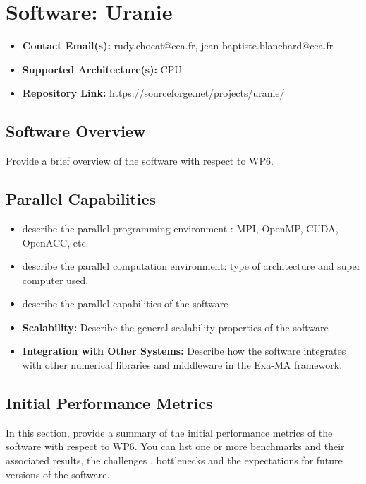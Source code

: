 \section{Software: Uranie}
\label{sec:WP6:Uranie:software}

\begin{itemize}
    \item \textbf{Contact Email(s):} rudy.chocat@cea.fr, jean-baptiste.blanchard@cea.fr
    \item \textbf{Supported Architecture(s):} CPU
    \item \textbf{Repository Link:} \href{https://sourceforge.net/projects/uranie/}{https://sourceforge.net/projects/uranie/}
\end{itemize}

\subsection{Software Overview}
\label{sec:WP6:Uranie:summary}

Provide a brief overview of the software with respect to WP6.

\subsection{Parallel Capabilities}
\label{sec:WP6:Uranie:performances}


\begin{itemize}
    \item describe the parallel programming  environment : MPI, OpenMP, CUDA, OpenACC, etc.
    \item describe the parallel computation environment: type of architecture and super computer used.
    \item describe the parallel capabilities of the software
    \item \textbf{Scalability:} Describe the general scalability properties of the software
    \item \textbf{Integration with Other Systems:} Describe how the software integrates with other numerical libraries and middleware in the Exa-MA framework.
\end{itemize}

\subsection{Initial Performance Metrics}
\label{sec:WP6:Uranie:metrics}

In this section, provide a summary of the initial performance metrics of the software with respect to WP6.
You can list one or more benchmarks and their associated results, the challenges , bottlenecks and the expectations for future versions of the software.



